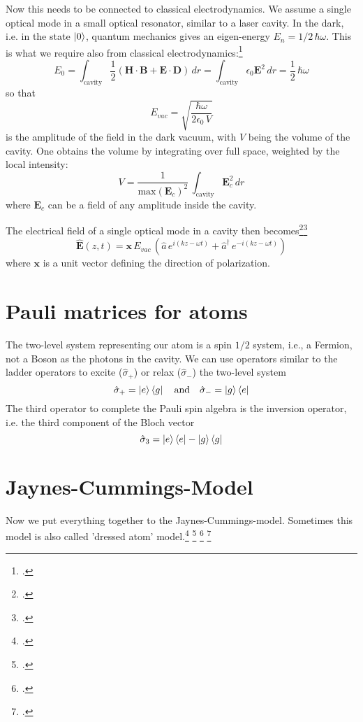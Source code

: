Now this needs to be connected to  classical electrodynamics. We assume a single optical mode in a small optical resonator, similar to a laser cavity. In the dark, i.e. in the state $\ket{0}$, quantum mechanics gives an eigen-energy $E_n = 1/2 \, \hbar \omega$. This is what we require also from classical electrodynamics:\footcite[chap. 7.5]{Fox}
\[
E_0 = 
 \int_\text{cavity} \frac{1}{2} 
 \left( \boldsymbol{H} \cdot  \boldsymbol{B} + \boldsymbol{E} \cdot  \boldsymbol{D} \right) \, dr = 
  \int_\text{cavity}  \epsilon_0 \boldsymbol{E}^2 \, dr = \frac{1}{2} \, \hbar \omega
\]
so that
\[
E_{vac} = \sqrt{\frac{\hbar \omega}{2 \epsilon_0 \, V}}
\]
is the amplitude of the field in the dark vacuum, with $V$ being the volume of the cavity. One obtains the volume by integrating over full space, weighted by the local intensity:
\[
V =  \frac{1}{\text{max}(\boldsymbol{E}_c)^2} \, \int_\text{cavity} \boldsymbol{E}_c^2\, dr
\]
where $\boldsymbol{E}_c$ can be a field of any amplitude inside the cavity.

The electrical field of a single optical mode in a cavity then becomes\footcite[chap. 2.1 and 2.4]{GerryKnight2005}\footcite[chap. 6.1]{Rand2016}
\[
\hat{\boldsymbol{E}}(z,t) = \boldsymbol{x} \, E_{vac} \, (\hat{a} \, e^{i (k z - \omega t)} + \hat{a}^\dagger   \, e^{-i (k z - \omega t)} ) 
\]
where $\boldsymbol{x}$ is a unit vector defining the direction of polarization. 

\section{Pauli matrices for atoms}

The two-level system representing our atom is a spin $1/2$ system, i.e., a Fermion, not a Boson as the photons in the cavity. We can use operators similar to the ladder operators to excite ($  \hat{\sigma}_+$) or relax ($  \hat{\sigma}_-$) the two-level system
\[
 \hat{\sigma}_+ = \ket{e} \bra{g} \quad \text{and} \quad 
  \hat{\sigma}_- = \ket{g} \bra{e}
\]
The third operator to complete the Pauli spin algebra is the inversion operator, i.e. the third component of the Bloch vector
\[
 \hat{\sigma}_3 = \ket{e} \bra{e} - \ket{g} \bra{g}
\] 



\section{Jaynes-Cummings-Model}
Now we put everything together to  the Jaynes-Cummings-model. Sometimes this model is also called 'dressed atom' model.\footcite[chap. 6.8]{Rand2016} \footcite[chap. 4.5]{GerryKnight2005} \footcite[chap. 10.4]{Fox}  \footcite[chap. 3.4]{HarocheRaimond2006}

